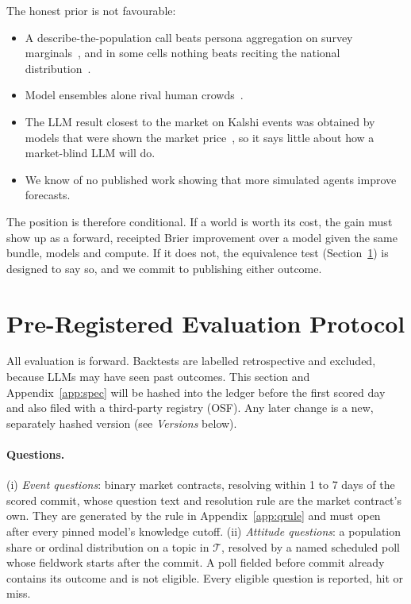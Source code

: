 \documentclass[11pt]{article}
\begin{document}
The honest prior is not favourable:
\begin{itemize}
  \item A describe-the-population call beats persona aggregation on survey marginals~\citep{jang2026instruction,doudkin2026marginal}, and in some cells nothing beats reciting the national distribution~\citep{doudkin2026marginal}.
  \item Model ensembles alone rival human crowds~\citep{schoenegger2024wisdom}.
  \item The LLM result closest to the market on Kalshi events was obtained by models that were shown the market price~\citep{yang2025prophet}, so it says little about how a market-blind LLM will do.
  \item We know of no published work showing that more simulated agents improve forecasts.
\end{itemize}

The position is therefore conditional. If a world is worth its cost, the gain must show up as a forward, receipted Brier improvement over a model given the same bundle, models and compute. If it does not, the equivalence test (Section~\ref{sec:protocol}) is designed to say so, and we commit to publishing either outcome.

\section{Pre-Registered Evaluation Protocol}\label{sec:protocol}

All evaluation is forward. Backtests are labelled retrospective and excluded, because LLMs may have seen past outcomes. This section and Appendix~\ref{app:spec} will be hashed into the ledger before the first scored day and also filed with a third-party registry (OSF). Any later change is a new, separately hashed version (see \emph{Versions} below).

\paragraph{Questions.} (i) \emph{Event questions}: binary market contracts, resolving within 1 to 7 days of the scored commit, whose question text and resolution rule are the market contract's own. They are generated by the rule in Appendix~\ref{app:qrule} and must open after every pinned model's knowledge cutoff. (ii) \emph{Attitude questions}: a population share or ordinal distribution on a topic in $\mathcal{T}$, resolved by a named scheduled poll whose fieldwork starts after the commit. A poll fielded before commit already contains its outcome and is not eligible. Every eligible question is reported, hit or miss.
\end{document}
